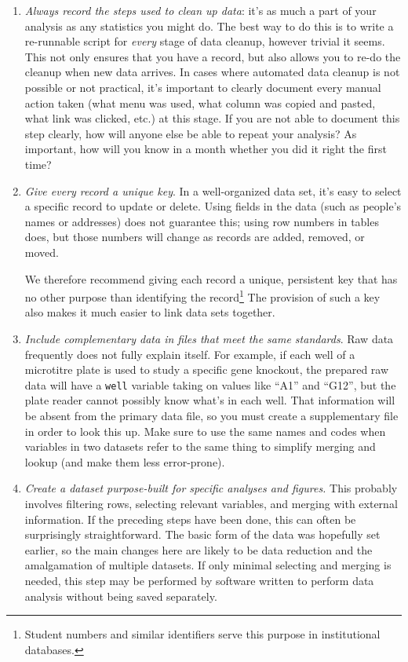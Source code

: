 \documentclass[10pt]{article}
\newcommand{\recommend}[1]{\textit{#1}}
\begin{document}
\begin{enumerate}
\item
  \recommend{Always record the steps used to clean up data}: it's as
  much a part of your analysis as any statistics you might do.  The
  best way to do this is to write a re-runnable script for
  \emph{every} stage of data cleanup, however trivial it seems.  This
  not only ensures that you have a record, but also allows you to
  re-do the cleanup when new data arrives.  In cases where automated
  data cleanup is not possible or not practical, it's important to
  clearly document every manual action taken (what menu was used, what
  column was copied and pasted, what link was clicked, etc.) at this
  stage.  If you are not able to document this step clearly, how will
  anyone else be able to repeat your analysis?  As important, how will
  you know in a month whether you did it right the first time?

\item
  \recommend{Give every record a unique key}.  In a well-organized
  data set, it's easy to select a specific record to update or delete.
  Using fields in the data (such as people's names or addresses) does
  not guarantee this; using row numbers in tables does, but those
  numbers will change as records are added, removed, or moved.

  We therefore recommend giving each record a unique, persistent key
  that has no other purpose than identifying the
  record\footnote{Student numbers and similar identifiers serve this
    purpose in institutional databases.} The provision of such a key
  also makes it much easier to link data sets together.

\item
  \recommend{Include complementary data in files that meet the same
    standards}.  Raw data frequently does not fully explain
  itself. For example, if each well of a microtitre plate is used to
  study a specific gene knockout, the prepared raw data will have a
  \texttt{well} variable taking on values like ``A1'' and ``G12'', but
  the plate reader cannot possibly know what's in each well. That
  information will be absent from the primary data file, so you must
  create a supplementary file in order to look this up. Make sure to
  use the same names and codes when variables in two datasets refer to
  the same thing to simplify merging and lookup (and make them less
  error-prone).

\item
  \recommend{Create a dataset purpose-built for specific analyses and
    figures.}  This probably involves filtering rows, selecting
  relevant variables, and merging with external information. If the
  preceding steps have been done, this can often be surprisingly
  straightforward. The basic form of the data was hopefully set
  earlier, so the main changes here are likely to be data reduction
  and the amalgamation of multiple datasets.  If only minimal
  selecting and merging is needed, this step may be performed by
  software written to perform data analysis without being saved
  separately.


\end{enumerate}
\end{document}
